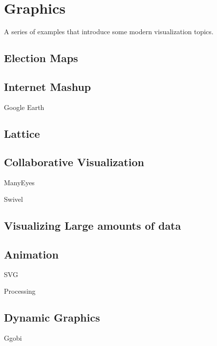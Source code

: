 
\chapter{Graphics}

A series of examples that introduce some modern visualization topics.


\section{Election Maps}

\section{Internet Mashup}

Google Earth

\section{Lattice }


\section{Collaborative Visualization}

ManyEyes

Swivel

\section{Visualizing Large amounts of data}

\section{Animation}

SVG

Processing

\section{Dynamic Graphics}

Ggobi


